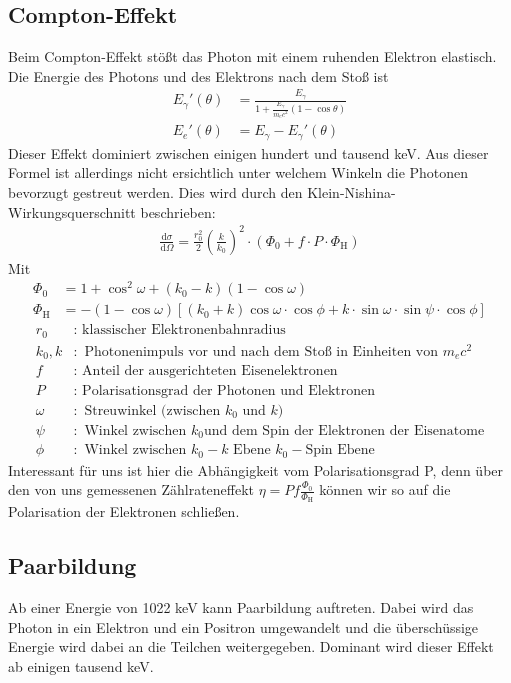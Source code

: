 \documentclass[twoside,colorback,accentcolor=tud4c,11pt]{tudreport}
\begin{document}
\subsection{Compton-Effekt}
Beim Compton-Effekt stößt das Photon mit einem ruhenden Elektron elastisch. Die Energie des Photons und des Elektrons nach dem Stoß ist 
\begin{align}
E_\gamma'(\theta)&=\frac{E_\gamma}{1+\frac{E_\gamma}{m_ec^2}(1-\cos\theta)}\\
E_e'(\theta)&=E_\gamma-E_\gamma'(\theta)\label{eq:comton}
\end{align}
Dieser Effekt dominiert zwischen einigen hundert und tausend keV. Aus dieser Formel ist allerdings nicht ersichtlich unter welchem Winkeln die Photonen bevorzugt gestreut werden. Dies wird durch den Klein-Nishina-Wirkungsquerschnitt beschrieben:
\begin{align}
\frac{\text{d}\sigma}{\text{d}\Omega}=\frac{r_0^2}{2}\left(\frac{k}{k_0}\right)^2\cdot\left(\Phi_0+f\cdot P\cdot\Phi_\text{H}\right)
\end{align}
Mit 
\begin{align}
\Phi_0&=1+\cos^2\omega+(k_0-k)(1-\cos\omega)\label{eq:phi0}\\
\Phi_\text{H}&=-(1-\cos\omega)[(k_0+k)\cos\omega\cdot\cos\phi+k\cdot\sin\omega\cdot\sin\psi\cdot\cos\phi]\label{eq:phih}
\end{align}
\begin{align*}
r_0&:\text{ klassischer Elektronenbahnradius}\\
k_0,k&:\text{ Photonenimpuls vor und nach dem Stoß in Einheiten von }m_ec^2\\
f&:\text{ Anteil der ausgerichteten Eisenelektronen}\\
P&:\text{ Polarisationsgrad der Photonen und Elektronen}\\
\omega&:\text{ Streuwinkel (zwischen }k_0\text{ und }k)\\
\psi&:\text{ Winkel zwischen }k_0\text{und dem Spin der Elektronen der Eisenatome}\\
\phi&:\text{ Winkel zwischen }k_0-k\text{ Ebene }k_0-\text{Spin Ebene}
\end{align*}
Interessant für uns ist hier die Abhängigkeit vom Polarisationsgrad P, denn über den von uns gemessenen Zählrateneffekt $\eta=Pf\frac{\Phi_0}{\Phi_\text{H}}$ können wir so auf die Polarisation der Elektronen schließen.
\subsection{Paarbildung}
Ab einer Energie von 1022 keV kann Paarbildung auftreten. Dabei wird das Photon in ein Elektron und ein Positron umgewandelt und die überschüssige Energie wird dabei an die Teilchen weitergegeben. Dominant wird dieser Effekt ab einigen tausend keV.
\end{document}
